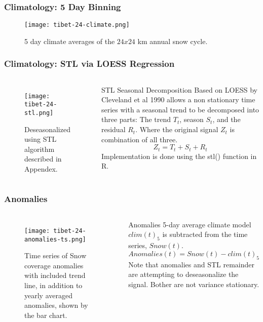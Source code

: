 \begin{frame}
\frametitle{Climatology: 5 Day Binning}
\begin{figure}
\centering
\begin{minipage}{.5\columnwidth}
\texttt{[image: tibet-24-climate.png]}
\caption{5 day climate averages of the $24 x 24$ km annual snow cycle.}
\end{minipage}
\end{figure}
\end{frame}

\begin{frame}
\frametitle{Climatology: STL via LOESS Regression}
\begin{columns}
\begin{figure}
\centering
\begin{minipage}{1\columnwidth}
\texttt{[image: tibet-24-stl.png]}
\caption{Deseasonalized using STL algorithm described in Appendex.}
\end{minipage}
\end{figure}
\begin{block}{STL}
Seasonal Decomposition Based on LOESS by Cleveland et al 1990 allows a non stationary time series with a seasonal trend to be decomposed into three parts: The trend $T_t$, season $S_t$, and the residual $R_t$. Where the original signal $Z_t$ is combination of all three.
\begin{equation*}
Z_t = T_t + S_t + R_t
\end{equation*}
Implementation is done using the stl() function in R.
\end{block}
\end{columns}
\end{frame}

\begin{frame}
\frametitle{Anomalies}
\begin{columns}
\begin{figure}[ht]
\centering
\begin{minipage}{1\columnwidth}
\texttt{[image: tibet-24-anomalies-ts.png]}
\caption{Time series of Snow coverage anomalies with included trend line, in addition to yearly averaged anomalies, shown by the bar chart.}
\end{minipage}
\end{figure}
\begin{block}{Anomalies}
5-day average climate model $clim(t)_{5}$ is subtracted from the time series, $Snow(t)$.
\begin{equation*}
Anomalies(t) = Snow(t)-clim(t)_{5}
\end{equation*}
Note that anomalies and STL remainder are attempting to deseasonalize the signal. Bother are not variance stationary.
\end{block}
\end{columns}
\end{frame}

